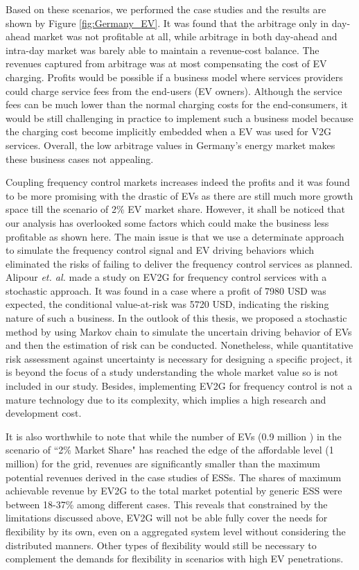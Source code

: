Based on these scenarios, we performed the case studies and the results are shown by Figure \ref{fig:Germany_EV}. It was found that the arbitrage only in day-ahead market was not profitable at all, while arbitrage in both day-ahead and intra-day market was barely able to maintain a revenue-cost balance. The revenues captured from arbitrage was at most compensating the cost of EV charging. Profits would be possible if a business model where services providers could charge service fees from the end-users (EV owners). Although the service fees can be much lower than the normal charging costs for the end-consumers, it would be still challenging in practice to implement such a business model because the charging cost become implicitly embedded when a EV was used for V2G services. Overall, the low arbitrage values in Germany's energy market makes these business cases not appealing. 

Coupling frequency control markets increases indeed the profits and it was found to be more promising with the drastic of EVs as there are still much more growth space till the scenario of 2\% EV market share. However, it shall be noticed that our analysis has overlooked some factors which could make the business less profitable as shown here. The main issue is that we use a determinate approach to simulate the frequency control signal and EV driving behaviors which eliminated the risks of failing to deliver the frequency control services as planned. Alipour \textit{et. al.}\cite{Alipour2017} made a study on EV2G for frequency control services with a stochastic approach. It was found in a case where a profit of 7980 USD was expected, the conditional value-at-risk was 5720 USD, indicating the risking nature of such a business. In the outlook of this thesis, we proposed a stochastic method by using Markov chain to simulate the uncertain driving behavior of EVs and then the estimation of risk can be conducted. Nonetheless, while quantitative risk assessment against uncertainty is necessary for designing a specific project, it is beyond the focus of a study understanding the whole market value so is not included in our study. Besides, implementing EV2G for frequency control is not a mature technology due to its complexity\cite{Peng2017}\cite{Shafie-Khah2015}\cite{Bessa2014}\cite{Bessa2013}, which implies a high research and development cost.

It is also worthwhile to note that while the number of EVs (0.9 million ) in the scenario of ``2\% Market Share" has reached the edge of the affordable level (1 million) for the grid, revenues are significantly smaller than the maximum potential revenues derived in the case studies of ESSs. The shares of maximum achievable revenue by EV2G to the total market potential by generic ESS were between 18-37\% among different cases. This reveals that constrained by the limitations discussed above, EV2G will not be able fully cover the needs for flexibility by its own, even on a aggregated system level without considering the distributed manners. Other types of flexibility would still be necessary to complement the demands for flexibility in scenarios with high EV penetrations.


